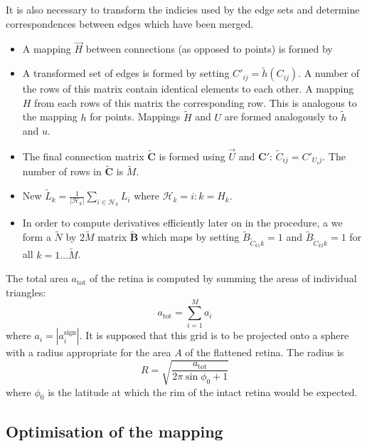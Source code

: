 \documentclass{article}
\begin{document}
It is also necessary to transform the indicies used by the edge sets
and determine correspondences between edges which have been merged. 
\begin{itemize}
\item A mapping $\vec{H}$ between connections (as opposed to points)
  is formed by 
\item A transformed set of edges is formed by setting $C'_{ij} =
  \tilde h(C_{ij})$. A number of the rows of this matrix contain
  identical elements to each other. A mapping $H$ from each rows of
  this matrix the corresponding row. This is analogous to the mapping
  $h$ for points. Mappings $\tilde{H}$ and $U$ are formed
  analogously to $\tilde{h}$ and $u$.
\item The final connection matrix $\tilde{\mathbf{C}}$ is formed using
  $\vec{U}$ and $\mathbf{C}'$: $\tilde C_{ij} = C'_{U_ij}$. The number
  of rows in $\tilde{\mathbf{C}}$ is $\tilde M$.
\item New $\tilde L_k = \frac{1}{|\mathcal{H}_k|}
  \sum_{i\in\mathcal{H}_k} L_i$ where $\mathcal{H}_k = i: k=H_k$. 
\item In order to compute derivatives efficiently later on in the
  procedure, a we form a $\tilde N$ by $2\tilde M$ matrix
  $\tilde{\mathbf{B}}$ which maps by setting $\tilde B_{\tilde
    C_{k1}k} = 1$ and $\tilde B_{\tilde C_{k2}k} = 1$ for all
  $k=1\dots \tilde M$.
\end{itemize}

The total area $a_\mathrm{tot}$ of the retina is computed by summing the areas of
individual triangles:
\begin{displaymath}
  a_\mathrm{tot} = \sum_{i=1}^M a_i
\end{displaymath}
where $a_i = | a_i^\mathrm{sign}|$.  It is supposed that this grid is
to be projected onto a sphere with a radius appropriate for the area
$A$ of the flattened retina. The radius is
\begin{equation}
  \label{fold-sphere:eq:1}
  R = \sqrt{\frac{a_\mathrm{tot}}{2\pi\sin\phi_0+1}}
\end{equation}
where $\phi_0$ is the latitude at which the rim of the intact retina
would be expected.


\subsection{Optimisation of the mapping}
\label{fold-sphere:sec:energy-function}
\end{document}

